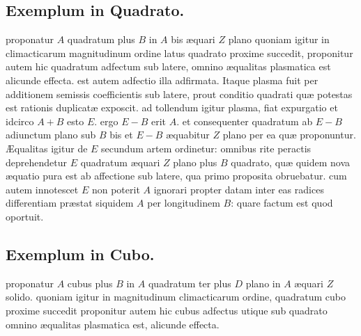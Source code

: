 \documentclass[11pt,a4paper]{article}
\begin{document}
\subsection*{Exemplum in Quadrato.}

proponatur $A$ quadratum plus $B$ in $A$ bis æquari $Z$ plano quoniam igitur in climacticarum magnitudinum ordine latus quadrato proxime succedit, proponitur autem hic quadratum adfectum sub latere, omnino æqualitas plasmatica est alicunde effecta. est autem adfectio illa adfirmata. Itaque plasma fuit per additionem semissis coefficientis sub latere, prout conditio quadrati quæ potestas est rationis duplicatæ exposcit. ad tollendum igitur plasma, fiat expurgatio  et idcirco $A + B$ esto $E$. ergo $E - B$ \struck{\ill{}} erit $A$. et consequenter quadratum ab $E - B$ adiunctum plano sub $B$ bis et $E - B$ æquabitur $Z$ plano per ea quæ proponuntur. Æqualitas igitur de $E$ secundum artem ordinetur: omnibus rite peractis deprehendetur $E$ quadratum æquari $Z$ plano plus $B$ quadrato, quæ quidem nova æquatio pura est ab affectione sub latere, qua primo proposita obruebatur. cum autem innotescet $E$ non poterit $A$ ignorari propter datam inter eas radices differentiam præstat siquidem \ill{} $A$ per longitudinem $B$: quare factum est quod oportuit.

\subsection*{Exemplum in Cubo.}

proponatur $A$ cubus plus $B$ in $A$ quadratum ter plus $D$ plano in $A$ æquari $Z$ solido. quoniam igitur in magnitudinum climacticarum ordine, quadratum cubo proxime succedit proponitur autem hic cubus adfectus utique sub quadrato omnino æqualitas plasmatica est, alicunde effecta.

\end{document}
